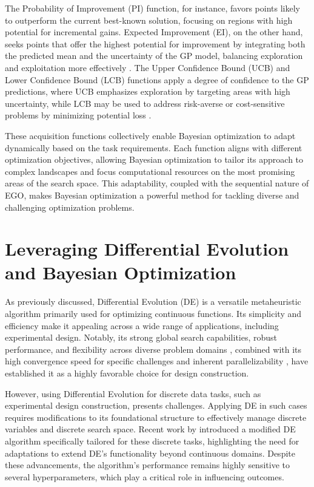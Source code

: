 The Probability of Improvement (PI) function, for instance, favors points likely to outperform the current best-known solution, focusing on regions with high potential for incremental gains. Expected Improvement (EI), on the other hand, seeks points that offer the highest potential for improvement by integrating both the predicted mean and the uncertainty of the GP model, balancing exploration and exploitation more effectively \parencite{mockus1994application}. The Upper Confidence Bound (UCB) and Lower Confidence Bound (LCB) functions apply a degree of confidence to the GP predictions, where UCB emphasizes exploration by targeting areas with high uncertainty, while LCB may be used to address risk-averse or cost-sensitive problems by minimizing potential loss \parencite{srinivas2009gaussian}.

These acquisition functions collectively enable Bayesian optimization to adapt dynamically based on the task requirements. Each function aligns with different optimization objectives, allowing Bayesian optimization to tailor its approach to complex landscapes and focus computational resources on the most promising areas of the search space. This adaptability, coupled with the sequential nature of EGO, makes Bayesian optimization a powerful method for tackling diverse and challenging optimization problems.


\section{Leveraging Differential Evolution and Bayesian Optimization}
As previously discussed, Differential Evolution (DE) is a versatile metaheuristic algorithm primarily used for optimizing continuous functions. Its simplicity and efficiency make it appealing across a wide range of applications, including experimental design. Notably, its strong global search capabilities, robust performance, and flexibility across diverse problem domains \parencite{storn1997differential}, combined with its high convergence speed for specific challenges \parencite{babu2003differential} and inherent parallelizability \parencite{kukkonen2006constrained}, have established it as a highly favorable choice for design construction.

However, using Differential Evolution for discrete data tasks, such as experimental design construction, presents challenges. Applying DE in such cases requires modifications to its foundational structure to effectively manage discrete variables and discrete search space. Recent work by \textcite{stokes2023metaheuristic}introduced a modified DE algorithm specifically tailored for these discrete tasks, highlighting the need for adaptations to extend DE's functionality beyond continuous domains. Despite these advancements, the algorithm's performance remains highly sensitive to several hyperparameters, which play a critical role in influencing outcomes.

